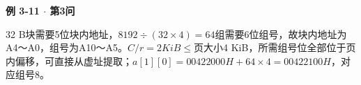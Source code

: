 {\color{ink}\bfseries 例 3-11 \(\cdot \) 第3问}\par\vspace{1bp}32 B块需要5位块内地址，\(8192\div (32\times 4)=\allowbreak{}64\)组需要6位组号，故块内地址为A4～A0，组号为A10～A5。\(C/\allowbreak{}r=\allowbreak{}2 KiB\le \)页大小4 KiB，所需组号位全部位于页内偏移，可直接从虚址提取；\(a[1][0]=\allowbreak{}0042 2000H+\allowbreak{}64\times 4=\allowbreak{}0042 2100H\)，对应组号8。
